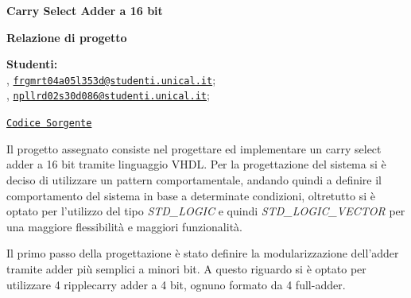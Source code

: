 \usepackage{listings}
\usepackage{xcolor}





\begin{Large}
    \textsf{\textbf{Carry Select Adder a 16 bit}}\\
\end{Large}
\textbf{Relazione di progetto}

\vspace{1ex}

\textsf{\textbf{Studenti:}} \\
, \href{frgmrt04a05l353d@studenti.unical.it}{\texttt{frgmrt04a05l353d@studenti.unical.it}};\\
, \href{npllrd02s30d086@studenti.unical.it} {\texttt{npllrd02s30d086@studenti.unical.it}};

\href{https://github.com/Zi0LEO/elettronica_digitale}{\texttt{Codice Sorgente}}


\vspace{2ex}

Il progetto assegnato consiste nel progettare ed implementare un carry select adder a 16 bit tramite linguaggio VHDL.
Per la progettazione del sistema si è deciso di utilizzare un pattern comportamentale, andando quindi a definire il comportamento del sistema in base a determinate condizioni, oltretutto si è optato per l'utilizzo del tipo \textit{STD\_LOGIC} e quindi \textit{STD\_LOGIC\_VECTOR} per una maggiore flessibilità e maggiori funzionalità.

Il primo passo della progettazione è stato definire la modularizzazione dell'adder tramite adder più semplici a minori bit. 
A questo riguardo si è optato per utilizzare 4 ripplecarry adder a 4 bit, ognuno formato da 4 full-adder.

